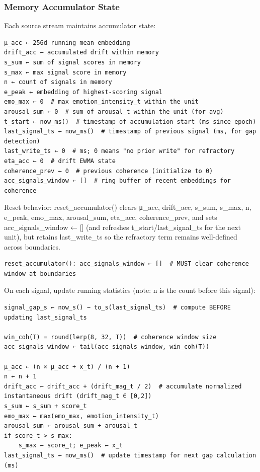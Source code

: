 \documentclass[
  letterpaper,
  DIV=11,
  numbers=noendperiod]{scrartcl}
\begin{document}
\subsubsection{Memory Accumulator State}\label{sec-accumulator}

Each source stream maintains accumulator state:

\begin{verbatim}
μ_acc ← 256d running mean embedding
drift_acc ← accumulated drift within memory
s_sum ← sum of signal scores in memory
s_max ← max signal score in memory
n ← count of signals in memory
e_peak ← embedding of highest-scoring signal
emo_max ← 0  # max emotion_intensity_t within the unit
arousal_sum ← 0  # sum of arousal_t within the unit (for avg)
t_start ← now_ms()  # timestamp of accumulation start (ms since epoch)
last_signal_ts ← now_ms()  # timestamp of previous signal (ms, for gap detection)
last_write_ts ← 0  # ms; 0 means "no prior write" for refractory
eta_acc ← 0  # drift EWMA state
coherence_prev ← 0  # previous coherence (initialize to 0)
acc_signals_window ← []  # ring buffer of recent embeddings for coherence
\end{verbatim}

Reset behavior: reset\_accumulator() clears μ\_acc, drift\_acc, s\_sum,
s\_max, n, e\_peak, emo\_max, arousal\_sum, eta\_acc, coherence\_prev,
and sets acc\_signals\_window ← {[}{]} (and refreshes
t\_start/last\_signal\_ts for the next unit), but retains
last\_write\_ts so the refractory term remains well-defined across
boundaries.

\begin{verbatim}
reset_accumulator(): acc_signals_window ← []  # MUST clear coherence window at boundaries
\end{verbatim}

On each signal, update running statistics (note: n is the count before
this signal):

\begin{verbatim}
signal_gap_s ← now_s() − to_s(last_signal_ts)  # compute BEFORE updating last_signal_ts

win_coh(T) = round(lerp(8, 32, T))  # coherence window size
acc_signals_window ← tail(acc_signals_window, win_coh(T))

μ_acc ← (n × μ_acc + x_t) / (n + 1)
n ← n + 1
drift_acc ← drift_acc + (drift_mag_t / 2)  # accumulate normalized instantaneous drift (drift_mag_t ∈ [0,2])
s_sum ← s_sum + score_t
emo_max ← max(emo_max, emotion_intensity_t)
arousal_sum ← arousal_sum + arousal_t
if score_t > s_max:
    s_max ← score_t; e_peak ← x_t
last_signal_ts ← now_ms()  # update timestamp for next gap calculation (ms)
\end{verbatim}
\end{document}
